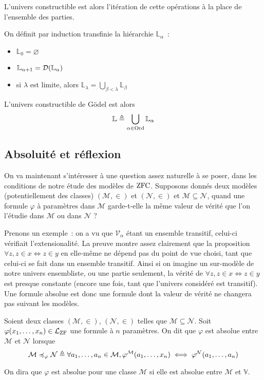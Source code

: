 L'univers constructible est alors l'itération de cette opérations à la place de
l'ensemble des parties.

\begin{definition}\label{def.L}
  On définit par induction transfinie la hiérarchie $\mathbb L_\alpha$~:
  \begin{itemize}
  \item $\mathbb L_0 = \varnothing$
  \item $\mathbb L_{\alpha + 1} = \mathcal{D} (\mathbb L_\alpha)$
  \item si $\lambda$ est limite, alors
    $\displaystyle\mathbb L_\lambda = \bigcup_{\beta < \lambda} \mathbb L_\beta$
  \end{itemize}
  L'univers constructible de Gödel est alors
  \[\mathbb L \triangleq \bigcup_{\alpha \in \operatorname{Ord}} \mathbb L_\alpha\]
\end{definition}

\subsection{Absoluité et réflexion}

On va maintenant s'intéresser à une question assez naturelle à se poser, dans
les conditions de notre étude des modèles de $\operatorname{ZFC}$. Supposons donnés deux
modèles (potentiellement des classes) $(\mathcal M,\in)$ et $(\mathcal N,\in)$
et $\mathcal M \subseteq \mathcal N$, quand une formule $\varphi$ à paramètres
dans $\mathcal M$ garde-t-elle la même valeur de vérité que l'on l'étudie dans
$\mathcal M$ ou dans $\mathcal N$ ?

Prenons un exemple~: on a vu que $\mathcal V_\alpha$ étant un ensemble
transitif, celui-ci vérifiait l'extensionalité. La preuve montre assez
clairement que la proposition $\forall z, z \in x \iff z \in y$ en elle-même
ne dépend pas du point de vue choisi, tant que celui-ci se fait dans un
ensemble transitif. Ainsi si on imagine un sur-modèle de notre univers
ensembliste, ou une partie seulement, la vérité de
$\forall z, z \in x \iff z \in y$ est presque constante (encore une fois, tant
que l'univers considéré est transitif). Une formule absolue est donc une
formule dont la valeur de vérité ne changera pas suivant les modèles.

\begin{definition}
  Soient deux classes $(\mathcal M,\in)$, $(\mathcal N,\in)$ telles que
  $\mathcal M \subseteq \mathcal N$.
  Soit $\varphi(x_1,\ldots,x_n) \in \mathcal L_{\operatorname{ZF}}$ une formule à $n$
  paramètres. On dit que $\varphi$ est absolue entre $\mathcal M$ et
  $\mathcal N$ lorsque
  \[\mathcal M \preccurlyeq_\varphi \mathcal N \triangleq
  \forall a_1,\ldots,a_n \in \mathcal M, \varphi^{\mathcal M}(a_1,\ldots,x_n)
  \iff \varphi^{\mathcal N}(a_1,\ldots,a_n)\]

  On dira que $\varphi$ est absolue pour une classe $\mathcal M$ si elle est
  absolue entre $\mathcal M$ et $\mathbb V$.
\end{definition}

